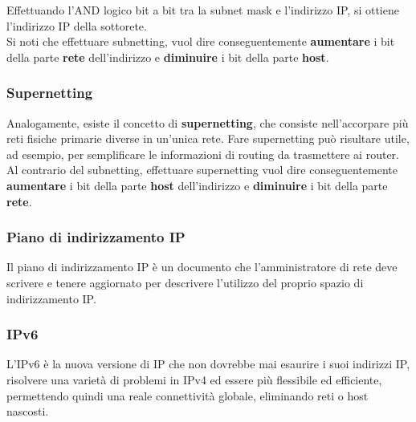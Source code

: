 \documentclass{article}
\begin{document}
            Effettuando l'AND logico bit a bit tra la subnet mask e l'indirizzo IP, si ottiene l'indirizzo IP della
            sottorete.\\
            
            Si noti che effettuare subnetting, vuol dire conseguentemente \textbf{aumentare} i bit della parte \textbf{rete}
            dell’indirizzo e \textbf{diminuire} i bit della parte \textbf{host}.


            \subsubsection{Supernetting}
            Analogamente, esiste il concetto di \textbf{supernetting}, che consiste nell’accorpare più reti fisiche
            primarie diverse in un’unica rete. Fare supernetting può risultare utile, ad esempio, per
            semplificare le informazioni di routing da trasmettere ai router.\\

            Al contrario del subnetting, effettuare supernetting vuol dire conseguentemente \textbf{aumentare} i
            bit della parte \textbf{host} dell’indirizzo e \textbf{diminuire} i bit della parte \textbf{rete}.
            
            \subsubsection{Piano di indirizzamento IP}
            Il piano di indirizzamento IP è un documento che l’amministratore di rete deve scrivere e tenere
            aggiornato per descrivere l’utilizzo del proprio spazio di indirizzamento IP.
            
            \subsubsection{IPv6}
            L’IPv6 è la nuova versione di IP che non dovrebbe mai esaurire i suoi indirizzi IP, risolvere una
            varietà di problemi in IPv4 ed essere più flessibile ed efficiente, permettendo quindi una reale
            connettività globale, eliminando reti o host nascosti.\\
            
\end{document}
